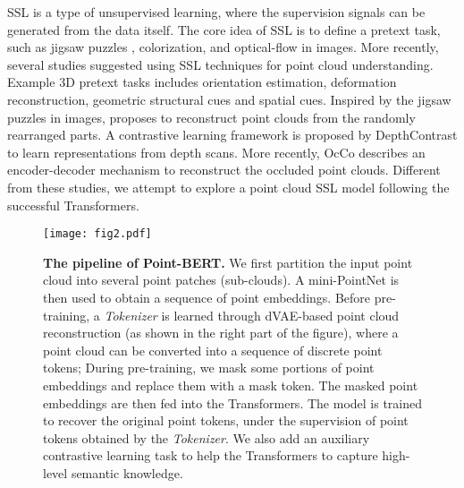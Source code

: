  SSL is a type of unsupervised learning, where the supervision signals can be generated from the data itself\cite{hinton2020aaai}. The core idea of SSL is to define a pretext task, such as jigsaw puzzles \cite{jigsaw}, colorization\cite{colorization}, and optical-flow\cite{optical-flow} in images. More recently, several studies suggested using SSL techniques for point cloud understanding\cite{moco, infoce,pointcontrast,li2018so,Jigsaw3D,foldingnet,occo,rao2020global,eckart2021self,info3d,MD}. Example 3D pretext tasks includes orientation estimation\cite{Rotation3D},  deformation reconstruction\cite{achituve2021self}, geometric structural cues\cite{MortonNet} and spatial cues\cite{mersch2021self,sharma2020self}. Inspired by the jigsaw puzzles in images\cite{jigsaw}, \cite{Jigsaw3D} proposes to reconstruct point clouds from the randomly rearranged parts. A contrastive learning framework is proposed by DepthContrast \cite{DepthContrast} to learn representations from depth scans. More recently, OcCo\cite{occo} describes an encoder-decoder mechanism to reconstruct the occluded point clouds. Different from these studies, we attempt to explore a point cloud SSL model following the successful Transformers\cite{vaswani2017attention}.
	
\begin{figure*}[t]
\centering 
\texttt{[image: fig2.pdf]}
\caption{ \small \textbf{The pipeline of Point-BERT.} We first partition the input point cloud into several point patches (sub-clouds).  A mini-PointNet\cite{pointnet} is then used to obtain a sequence of point embeddings. Before pre-training, a \textit{Tokenizer} is learned through dVAE-based point cloud reconstruction (as shown in the right part of the figure), where a point cloud can be converted into a sequence of discrete point tokens; During pre-training, we mask some portions of point embeddings and replace them with a mask token. The masked point embeddings are then fed into the Transformers. The model is trained to recover the original point tokens, under the supervision of point tokens obtained by the \textit{Tokenizer}. We also add an auxiliary  contrastive learning task to help the Transformers to capture high-level semantic knowledge.}
\label{fig:pipeline} \vspace{-10pt}
\end{figure*}
	
